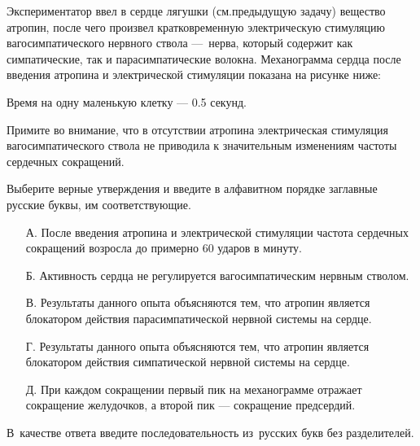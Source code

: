 
Экспериментатор ввел в сердце лягушки (см.предыдущую задачу) вещество атропин, после чего произвел кратковременную электрическую стимуляцию вагосимпатического нервного ствола — нерва, который содержит как симпатические, так и парасимпатические волокна. Механограмма сердца после введения атропина и электрической стимуляции показана на рисунке ниже:


Время на одну маленькую клетку — 0.5 секунд.

Примите во внимание, что в отсутствии атропина электрическая стимуляция вагосимпатического ствола не приводила к значительным изменениям частоты сердечных сокращений.  

Выберите верные утверждения и введите в алфавитном порядке заглавные русские буквы, им соответствующие.

\begin{enumerate}
    \item[А.] После введения атропина и электрической стимуляции частота сердечных сокращений возросла до примерно 60 ударов в минуту.
    \item[Б.] Активность сердца не регулируется вагосимпатическим нервным стволом.
    \item[В.] Результаты данного опыта объясняются тем, что атропин является блокатором действия парасимпатической нервной системы на сердце.
    \item[Г.] Результаты данного опыта объясняются тем, что атропин является блокатором действия симпатической нервной системы на сердце.
    \item[Д.] При каждом сокращении первый пик на механограмме отражает сокращение желудочков, а второй пик — сокращение предсердий.
\end{enumerate}
    
В качестве ответа введите последовательность из русских букв без разделителей.